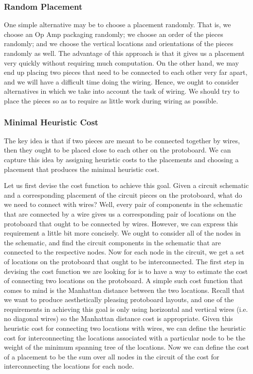 \subsubsection{Random Placement}

One simple alternative may be to choose a placement randomly. That is, we choose
an Op Amp packaging randomly; we choose an order of the pieces randomly; and we
choose the vertical locations and orientations of the pieces randomly as well.
The advantage of this
approach is that it gives us a placement very quickly without requiring much
computation. On the other hand, we may end up placing two pieces that need to be
connected to each other very far apart, and we will have a difficult time doing
the wiring. Hence, we ought to consider alternatives in which we take into
account the task of wiring. We should try to place the pieces so as to require
as little work during wiring as possible.

\subsubsection{Minimal Heuristic Cost}

The key idea is that if two pieces are meant to be connected together by wires,
then they ought to be placed close to each other on the protoboard. We can
capture this idea by assigning heuristic costs to the placements and choosing
a placement that produces the minimal heuristic cost.

Let us first devise the cost function to achieve this goal. Given a circuit
schematic and a corresponding placement of the circuit pieces on the protoboard,
what do we need to connect with wires? Well, every pair of components in the
schematic that are connected by a wire gives us a corresponding pair of
locations on the protoboard that ought to be connected by wires. However, we can
express this requirement a little bit more concisely. We ought to consider all
of the nodes in the schematic, and find the circuit components in the schematic
that are connected to the respective nodes. Now for each node in the circuit, we
get a set of locations on the protoboard that ought to be interconnected. The
first step in devising the cost function we are looking for is to have a way to
estimate the cost of connecting two locations on the protoboard. A simple such
cost function that comes to mind is the Manhattan distance between the two
locations. Recall that we want to produce aesthetically pleasing protoboard
layouts, and one of the requirements in achieving this goal is only using
horizontal and vertical wires (i.e. no diagonal wires) so the Manhattan distance
cost is appropriate. Given this heuristic cost for connecting two locations with
wires, we can define the heuristic cost for interconnecting the locations
associated with a particular node to be the weight of the minimum spanning tree
of the locations. Now we can define the cost of a placement to be the sum over
all nodes in the circuit of the cost for interconnecting the locations for each
node.

